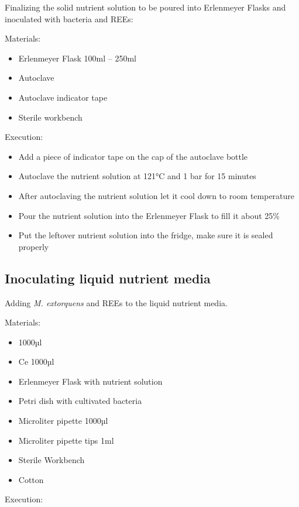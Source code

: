 Finalizing the solid nutrient solution to be poured into Erlenmeyer Flasks and inoculated
with bacteria and REEs:

Materials:

\begin{itemize}
    \item Erlenmeyer Flask 100ml – 250ml
    \item Autoclave
    \item Autoclave indicator tape
    \item Sterile workbench
\end{itemize}

Execution:

\begin{itemize}
    \item Add a piece of indicator tape on the cap of the autoclave bottle
    \item Autoclave the nutrient solution at 121°C and 1 bar for 15 minutes
    \item After autoclaving the nutrient solution let it cool down to room temperature
    \item Pour the nutrient solution into the Erlenmeyer Flask to fill it about 25\%
    \item Put the leftover nutrient solution into the fridge, make sure it is sealed
    properly
\end{itemize}

\subsection{Inoculating liquid nutrient media}
Adding \emph{M. extorquens} and REEs to the liquid nutrient media.

Materials:

\begin{itemize}
    \item {} 1000µl
    \item Ce 1000µl
    \item Erlenmeyer Flask with nutrient solution
    \item Petri dish with cultivated bacteria
    \item Microliter pipette 1000µl
    \item Microliter pipette tips 1ml
    \item Sterile Workbench
    \item Cotton
\end{itemize}

Execution:

